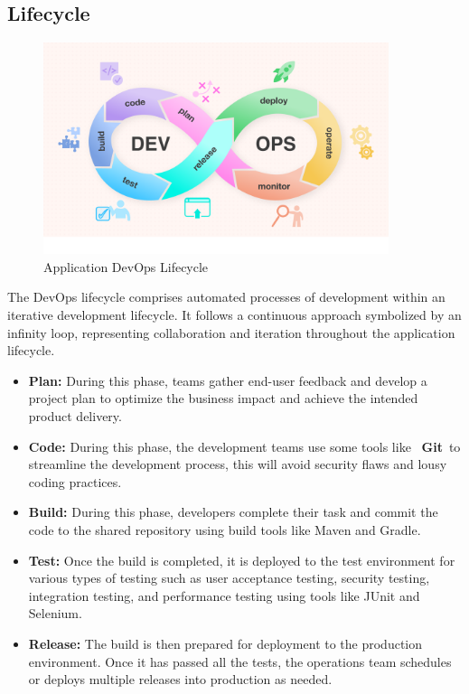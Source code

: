 \subsection{Lifecycle}
\begin{figure}[H]
  \centering
  \includegraphics[width=0.9\textwidth]{src/assets/chapters/devopslifecycle.png}
  \caption{Application DevOps Lifecycle}
  \label{fig:application-devops-lifecycle}
\end{figure}

The DevOps lifecycle comprises automated processes of development within an iterative development lifecycle. It follows a continuous approach symbolized by an infinity loop, representing collaboration and iteration throughout the application lifecycle.

\begin{itemize}
  \item \textbf{Plan:} During this phase, teams gather end-user feedback and develop a project plan to optimize the business impact and achieve the intended product delivery.
  \item \textbf{Code:} During this phase, the development teams use some tools like  \textbf{Git} to streamline the development process, this will avoid security flaws and lousy coding practices.
  \item \textbf{Build:} During this phase, developers complete their task and  commit the code to the shared repository using build tools like Maven and Gradle.
  \item \textbf{Test:} Once the build is completed, it is deployed to the test environment for various types of testing such as user acceptance testing, security testing, integration testing, and performance testing using tools like JUnit and Selenium.
  \item \textbf{Release:} The build is then prepared for deployment to the production environment. Once it has passed all the tests, the operations team schedules or deploys multiple releases into production as needed.

\end{itemize}


